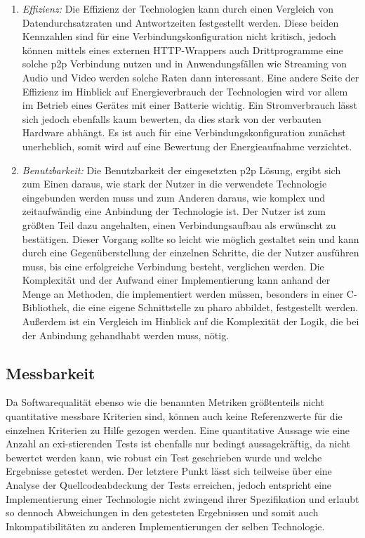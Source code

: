 \begin{enumerate}
    	\item {\it Effizienz:}
    	Die Effizienz der Technologien kann durch einen Vergleich von Datendurchsatzraten und Antwortzeiten festgestellt werden. Diese beiden Kennzahlen sind für eine Verbindungskonfiguration nicht kritisch, jedoch können mittels eines externen HTTP-Wrappers auch Drittprogramme eine solche p2p Verbindung nutzen und in Anwendungsfällen wie Streaming von Audio und Video werden solche Raten dann interessant. Eine andere Seite der Effizienz im Hinblick auf Energieverbrauch der Technologien wird vor allem im Betrieb eines Gerätes mit einer Batterie wichtig. Ein Stromverbrauch lässt sich jedoch ebenfalls kaum bewerten, da dies stark von der verbauten Hardware abhängt. Es ist auch für eine Verbindungskonfiguration zunächst unerheblich, somit wird auf eine Bewertung der Energieaufnahme verzichtet.
    	\item {\it Benutzbarkeit:}
    	Die Benutzbarkeit der eingesetzten p2p Lösung, ergibt sich zum Einen daraus, wie stark der Nutzer in die verwendete Technologie eingebunden werden muss und zum Anderen daraus, wie komplex und zeitaufwändig eine Anbindung der Technologie ist.
    	Der Nutzer ist zum größten Teil dazu angehalten, einen Verbindungsaufbau als erwünscht zu bestätigen. Dieser Vorgang sollte so leicht wie möglich gestaltet sein und kann durch eine \linebreak Gegenüberstellung der einzelnen Schritte, die der Nutzer ausführen muss, bis eine erfolgreiche Verbindung besteht, verglichen werden.
    	Die Komplexität und der Aufwand einer Implementierung kann anhand der Menge an Methoden, die implementiert werden müssen, besonders in einer C-Bibliothek, die eine eigene \linebreak Schnittstelle zu pharo abbildet, festgestellt werden. Außerdem ist ein Vergleich im Hinblick auf die Komplexität der Logik, die bei der Anbindung gehandhabt werden muss, nötig.
    	\end{enumerate}
	    	\pagebreak
    		\subsection{Messbarkeit}
		Da Softwarequalität ebenso wie die benannten Metriken größtenteils nicht quantitative messbare Kriterien sind, können auch keine Referenzwerte für die einzelnen Kriterien zu Hilfe gezogen werden. Eine quantitative Aussage wie eine Anzahl an exi-stierenden Tests ist ebenfalls nur bedingt aussagekräftig, da nicht bewertet werden kann, wie robust ein Test geschrieben wurde und welche Ergebnisse getestet werden. Der letztere Punkt lässt sich teilweise über eine Analyse der Quellcodeabdeckung der Tests erreichen, jedoch entspricht eine Implementierung einer Technologie nicht zwingend ihrer Spezifikation und erlaubt so dennoch Abweichungen in den getesteten Ergebnissen und somit auch Inkompatibilitäten zu anderen Implementierungen der selben Technologie.
		
